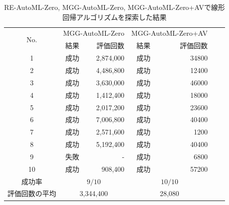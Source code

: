 \documentclass[11pt,oneside,openany,report]{jsbook}
\begin{document}
\begin{table}[tbp]
  \caption{RE-AutoML-Zero, MGG-AutoML-Zero, MGG-AutoML-Zero+AVで線形回帰アルゴリズムを探索した結果}
  \label{table:mgg_vs_mgg_av}
  \centering
  \begin{tabular}{|c|cr|cr|cr|}
    \hline
    \multirow{2}{*}{No. }
            & \multicolumn{2}{c|}{MGG-AutoML-Zero} & \multicolumn{2}{c|}{MGG-AutoML-Zero+AV}              \\
            & 結果                                   & 評価回数                                    & 結果 & 評価回数  \\
    \hline \hline
    1       & 成功                                   & 2,874,000                               & 成功 & 34800 \\
    2       & 成功                                   & 4,486,800                               & 成功 & 12400 \\
    3       & 成功                                   & 3,630,000                               & 成功 & 46000 \\
    4       & 成功                                   & 1,412,400                               & 成功 & 18000 \\
    5       & 成功                                   & 2,017,200                               & 成功 & 23600 \\
    6       & 成功                                   & 7,006,800                               & 成功 & 40400 \\
    7       & 成功                                   & 2,571,600                               & 成功 & 1200  \\
    8       & 成功                                   & 5,192,400                               & 成功 & 40400 \\
    9       & 失敗                                   & -                                       & 成功 & 6800  \\
    10      & 成功                                   & 908,400                                 & 成功 & 57200 \\
    \hline
    成功率     & \multicolumn{2}{c|}{$9/10$}          & \multicolumn{2}{c|}{$10/10$}                         \\
    \hline
    評価回数の平均 & \multicolumn{2}{c|}{3,344,400}       & \multicolumn{2}{c|}{28,080}                          \\
    \hline
  \end{tabular}
\end{table}
\end{document}
